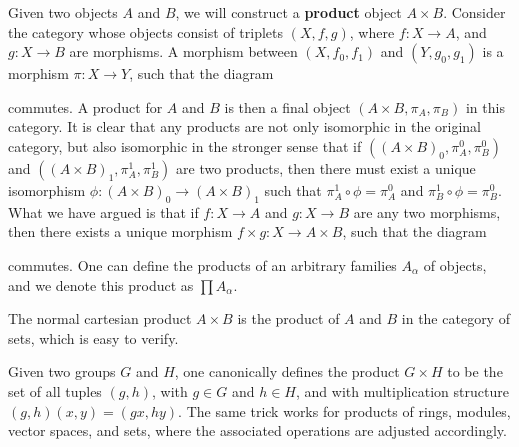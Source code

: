Given two objects $A$ and $B$, we will construct a {\bf product} object $A \times B$. Consider the category whose objects consist of triplets $(X,f,g)$, where $f: X \to A$, and $g: X \to B$ are morphisms. A morphism between $(X,f_0,f_1)$ and $(Y,g_0,g_1)$ is a morphism $\pi: X \to Y$, such that the diagram
%
\begin{center}
\end{center}
%
commutes. A product for $A$ and $B$ is then a final object $(A \times B, \pi_A, \pi_B)$ in this category. It is clear that any products are not only isomorphic in the original category, but also isomorphic in the stronger sense that if $((A \times B)_0, \pi_A^0, \pi_B^0)$ and $((A \times B)_1, \pi_A^1, \pi_B^1)$ are two products, then there must exist a unique isomorphism $\phi: (A \times B)_0 \to (A \times B)_1$ such that $\pi^1_A \circ \phi = \pi^0_A$ and $\pi^1_B \circ \phi = \pi^0_B$. What we have argued is that if $f: X \to A$ and $g: X \to B$ are any two morphisms, then there exists a unique morphism $f \times g: X \to A \times B$, such that the diagram
%
\begin{center}
\end{center}
%
commutes. One can define the products of an arbitrary families $A_\alpha$ of objects, and we denote this product as $\prod A_\alpha$.

\begin{example}
    The normal cartesian product $A \times B$ is the product of $A$ and $B$ in the category of sets, which is easy to verify.
\end{example}

\begin{example}
    Given two groups $G$ and $H$, one canonically defines the product $G \times H$ to be the set of all tuples $(g,h)$, with $g \in G$ and $h \in H$, and with multiplication structure $(g,h)(x,y) = (gx,hy)$. The same trick works for products of rings, modules, vector spaces, and sets, where the associated operations are adjusted accordingly.
\end{example}


